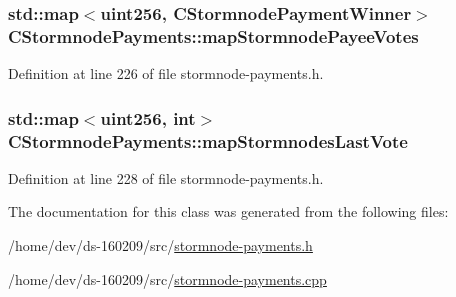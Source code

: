 \subsubsection[{map\+Stormnode\+Payee\+Votes}]{\setlength{\rightskip}{0pt plus 5cm}std\+::map$<${\bf uint256}, {\bf C\+Stormnode\+Payment\+Winner}$>$ C\+Stormnode\+Payments\+::map\+Stormnode\+Payee\+Votes}\label{class_c_stormnode_payments_a2227618f68b1655073c17d4b2ffe1c56}


Definition at line 226 of file stormnode-\/payments.\+h.

\hypertarget{class_c_stormnode_payments_a82f9ee8e4388b9640854bd3c70b76782}{}
\subsubsection[{map\+Stormnodes\+Last\+Vote}]{\setlength{\rightskip}{0pt plus 5cm}std\+::map$<${\bf uint256}, int$>$ C\+Stormnode\+Payments\+::map\+Stormnodes\+Last\+Vote}\label{class_c_stormnode_payments_a82f9ee8e4388b9640854bd3c70b76782}


Definition at line 228 of file stormnode-\/payments.\+h.



The documentation for this class was generated from the following files\+:\begin{DoxyCompactItemize}
\item 
/home/dev/ds-\/160209/src/\hyperlink{stormnode-payments_8h}{stormnode-\/payments.\+h}\item 
/home/dev/ds-\/160209/src/\hyperlink{stormnode-payments_8cpp}{stormnode-\/payments.\+cpp}\end{DoxyCompactItemize}
